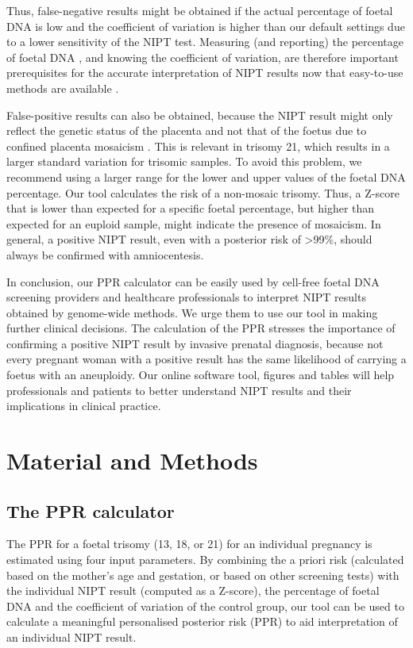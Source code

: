Thus, false-negative results might be obtained if the actual percentage of foetal DNA is low and the coefficient of variation is higher than our default settings due to a lower sensitivity of the NIPT test. 
Measuring (and reporting) the percentage of foetal DNA \cite{Canick_2012}, and knowing the coefficient of variation, are therefore important prerequisites for the accurate interpretation of NIPT results \cite{Chiu_2008,Lau_2012} now that easy-to-use methods are available \cite{Straver_2016}.

False-positive results can also be obtained, because the NIPT result might only reflect the genetic status of the placenta and not that of the foetus due to confined placenta mosaicism \cite{Choi_2012,Wang_2013,Mao_2014}. 
This is relevant in trisomy 21, which results in a larger standard variation for trisomic samples. 
To avoid this problem, we recommend using a larger range for the lower and upper values of the foetal DNA percentage. 
Our tool calculates the risk of a non-mosaic trisomy. Thus, a Z-score that is lower than expected for a specific foetal percentage, but higher than expected for an euploid sample, might indicate the presence of mosaicism. 
In general, a positive NIPT result, even with a posterior risk of \textgreater99\%, should always be confirmed with amniocentesis.

In conclusion, our PPR calculator can be easily used by cell-free foetal DNA screening providers and healthcare professionals to interpret NIPT results obtained by genome-wide methods. 
We urge them to use our tool in making further clinical decisions. The calculation of the PPR stresses the importance of confirming a positive NIPT result by invasive prenatal diagnosis, because not every pregnant woman with a positive result has the same likelihood of carrying a foetus with an aneuploidy. 
Our online software tool, figures and tables will help professionals and patients to better understand NIPT results and their implications in clinical practice.

\section{Material and Methods}
\subsection{The PPR calculator}
The PPR for a foetal trisomy (13, 18, or 21) for an individual pregnancy is estimated using four input parameters. 
By combining the a priori risk (calculated based on the mother’s age and gestation, or based on other screening tests) with the individual NIPT result (computed as a Z-score), the percentage of foetal DNA and the coefficient of variation of the control group, our tool can be used to calculate a meaningful personalised posterior risk (PPR) to aid interpretation of an individual NIPT result.

